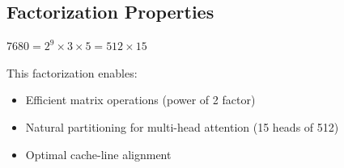 \subsection{Factorization Properties}

$7680 = 2^9 \times 3 \times 5 = 512 \times 15$

This factorization enables:
\begin{itemize}
    \item Efficient matrix operations (power of 2 factor)
    \item Natural partitioning for multi-head attention (15 heads of 512)
    \item Optimal cache-line alignment
\end{itemize}

